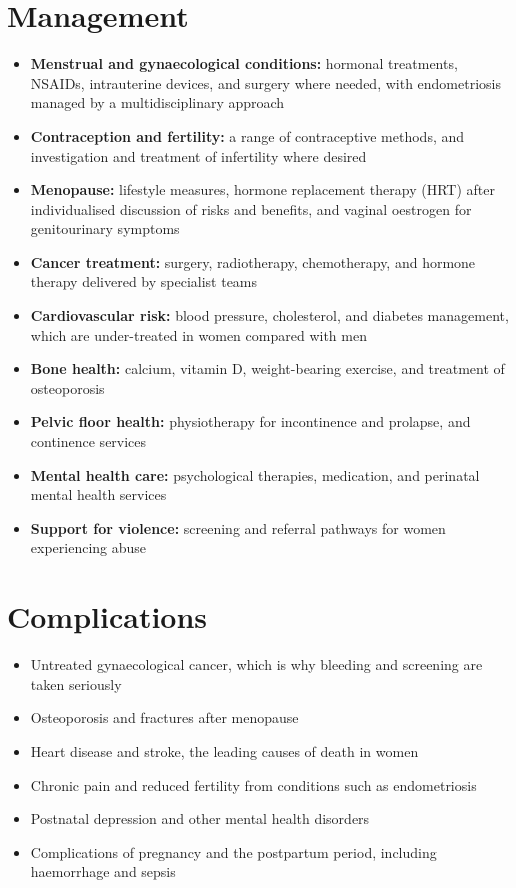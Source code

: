 \section*{Management}
\begin{itemize}
    \item \textbf{Menstrual and gynaecological conditions:} hormonal treatments, NSAIDs, intrauterine devices, and surgery where needed, with endometriosis managed by a multidisciplinary approach
    \item \textbf{Contraception and fertility:} a range of contraceptive methods, and investigation and treatment of infertility where desired
    \item \textbf{Menopause:} lifestyle measures, hormone replacement therapy (HRT) after individualised discussion of risks and benefits, and vaginal oestrogen for genitourinary symptoms
    \item \textbf{Cancer treatment:} surgery, radiotherapy, chemotherapy, and hormone therapy delivered by specialist teams
    \item \textbf{Cardiovascular risk:} blood pressure, cholesterol, and diabetes management, which are under-treated in women compared with men
    \item \textbf{Bone health:} calcium, vitamin D, weight-bearing exercise, and treatment of osteoporosis
    \item \textbf{Pelvic floor health:} physiotherapy for incontinence and prolapse, and continence services
    \item \textbf{Mental health care:} psychological therapies, medication, and perinatal mental health services
    \item \textbf{Support for violence:} screening and referral pathways for women experiencing abuse
\end{itemize}

\section*{Complications}
\begin{itemize}
    \item Untreated gynaecological cancer, which is why bleeding and screening are taken seriously
    \item Osteoporosis and fractures after menopause
    \item Heart disease and stroke, the leading causes of death in women
    \item Chronic pain and reduced fertility from conditions such as endometriosis
    \item Postnatal depression and other mental health disorders
    \item Complications of pregnancy and the postpartum period, including haemorrhage and sepsis
\end{itemize}

